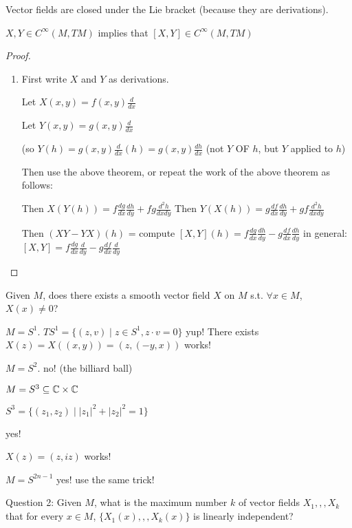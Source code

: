 \documentclass[11pt]{amsbook}
\newenvironment{dateenv}{
	\vspace{1em}
}{
	\vspace{1em}
}
\newcommand{\mydate}[4]{
	\newdate{#1}{#2}{#3}{#4}
	\begin{dateenv}
		\hfill\displaydate{#1}
	\end{dateenv}
}
\theoremstyle{mystyle} \newtheorem{thrm}[thm]{Theorem}
\theoremstyle{mystyle} \newtheorem{defi}[thm]{Definition}
\theoremstyle{mystyle} \newtheorem{coro}[thm]{Corollary}
\theoremstyle{mystyle} \newtheorem{propo}[thm]{Proposition}
\theoremstyle{mystyle} \newtheorem{lemm}[thm]{Lemma}
\numberwithin{thm}{section}
\newcommand{\x}{\times}
\begin{document}
\begin{example}
	Vector fields are closed under the Lie bracket (because they are derivations).

	$X, Y \in C^\infty(M, TM)$ implies that $[X,Y] \in C^\infty(M, TM)$
\end{example}
\begin{proof}
	\begin{enumerate}
		\item
		First write $X$ and $Y$ as derivations.

		Let $X(x,y) = f(x,y)\frac{d}{dx}$

		Let $Y(x,y) = g(x,y)\frac{d}{dx}$

		(so $Y(h) = g(x,y)\frac{d}{dx}(h) = g(x,y)\frac{dh}{dx}$  (not $Y$ OF $h$, but $Y$ applied to $h$)

Then use the above theorem, or repeat the work of the above theorem as follows:

		Then $X(Y(h)) = f \frac{dg}{dx} \frac{dh}{dy} + fg \frac{d^2h}{dxdy}$
		Then $Y(X(h)) = g \frac{df}{dx} \frac{dh}{dy} + gf \frac{d^2h}{dxdy}$

		Then $(XY - YX)(h)$ = compute
		$[X,Y](h) = f \frac{dg}{dx} \frac{dh}{dy} - g \frac{df}{dx} \frac{dh}{dy}$
		in general:
		$[X,Y] = f \frac{dg}{dx} \frac{d}{dy} - g \frac{df}{dx} \frac{d}{dy}$
	\end{enumerate}
\end{proof}

\mydate{d6}{12}{10}{2016}

Given $M$, does there exists a smooth vector field $X$ on $M$ s.t. $\forall x \in M$, $X(x) \neq 0$?

\begin{example}
	$M = S^1$.  $TS^1 = \{ (z,v) \mid z \in S^1, z \cdot v = 0 \}$
	yup!  There exists
	$X(z) = X((x,y)) = (z, (-y,x))$ works!
\end{example}
\begin{example}
	$M = S^2$.
	no! (the billiard ball)
\end{example}
\begin{example}
	$M = S^3 \subseteq \C \x \C$

	$S^3 = \{ (z_1,z_2) \mid |z_1|^2 + |z_2|^2 = 1 \}$

	yes!

	$X(z) = (z, iz)$ works!
\end{example}
\begin{example}
	$M = S^{2n-1}$
	yes!
	use the same trick!
\end{example}
Question 2:
Given $M$, what is the maximum number $k$ of vector fields $X_1,,,X_k$ that for every $x \in M$, $\{X_1(x),,,X_k(x)\}$ is linearly independent?
\end{document}
